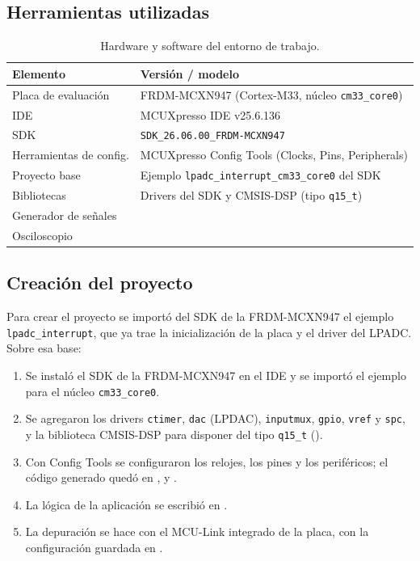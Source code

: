 \documentclass[11pt,a4paper]{article}
\begin{document}
\subsection{Herramientas utilizadas}

\begin{table}[H]
\centering
\caption{Hardware y software del entorno de trabajo.}
\label{tab:herramientas}
\begin{tabular}{@{}l l@{}}
\toprule
\textbf{Elemento} & \textbf{Versión / modelo}\\
\midrule
Placa de evaluación     & FRDM-MCXN947 (Cortex-M33, núcleo \texttt{cm33\_core0})\\
IDE                     & MCUXpresso IDE v25.6.136\\
SDK                     & \texttt{SDK\_26.06.00\_FRDM-MCXN947}\\
Herramientas de config. & MCUXpresso Config Tools (Clocks, Pins, Peripherals)\\
Proyecto base           & Ejemplo \texttt{lpadc\_interrupt\_cm33\_core0} del SDK\\
Bibliotecas             & Drivers del SDK y CMSIS-DSP (tipo \texttt{q15\_t})\\
Generador de señales    & \\
Osciloscopio            & \\
\bottomrule
\end{tabular}
\end{table}

\subsection{Creación del proyecto}

Para crear el proyecto  se importó del SDK de la FRDM-MCXN947
el ejemplo \texttt{lpadc\_\allowbreak interrupt}, que ya trae la inicialización de la placa
y el driver del LPADC. Sobre esa base:

\begin{enumerate}[nosep]
  \item Se instaló el SDK de la FRDM-MCXN947 en el IDE y se importó el
        ejemplo para el núcleo \texttt{cm33\_core0}.
  \item Se agregaron los drivers \texttt{ctimer}, \texttt{dac} (LPDAC),
        \texttt{inputmux}, \texttt{gpio}, \texttt{vref} y \texttt{spc}, y la
        biblioteca CMSIS-DSP para disponer del tipo \texttt{q15\_t}
        ().
  \item Con Config Tools se configuraron los relojes, los pines y los
        periféricos; el código generado quedó en ,
         y .
  \item La lógica de la aplicación se escribió en .
  \item La depuración se hace con el MCU-Link integrado de la placa, con la
        configuración guardada en .
\end{enumerate}
\end{document}
